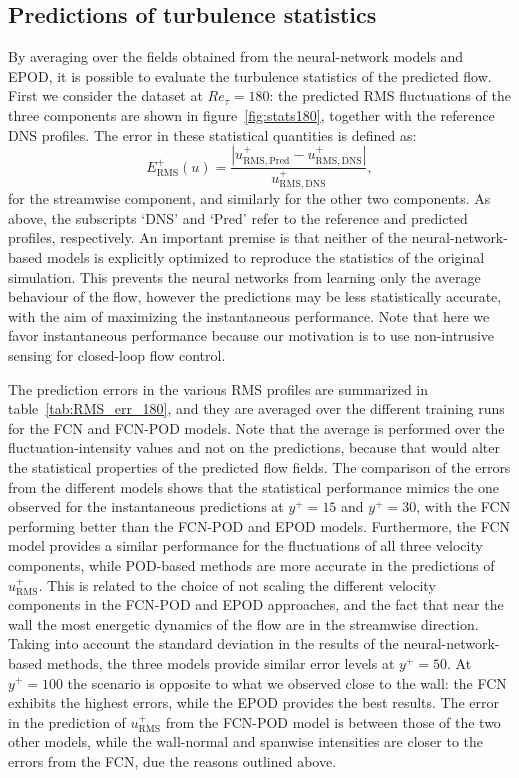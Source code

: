 \subsection{Predictions of turbulence statistics}\label{ss:stat}

By averaging over the fields obtained from the neural-network models and EPOD, it is possible to evaluate the turbulence statistics of the predicted flow.
First we consider the dataset at $Re_{\tau}=180$: the predicted RMS fluctuations of the three components are shown in figure~\ref{fig:stats180}, together with the reference DNS profiles.
The error in these statistical quantities is defined as:
%
\begin{equation}
    E_\mathrm{RMS}^+(u) = \frac{\left| u_\mathrm{RMS,Pred}^+ - u_\mathrm{RMS,DNS}^+ \right|}{u_\mathrm{RMS,DNS}^+},
\end{equation}
for the streamwise component, and similarly for the other two components.
As above, the subscripts `DNS' and `Pred' refer to the reference and predicted profiles, respectively.
An important premise is that neither of the neural-network-based models is explicitly optimized to reproduce the statistics of the original simulation.
This prevents the neural networks from learning only the average behaviour of the flow, however the predictions may be less statistically accurate, with the aim of maximizing the instantaneous performance.
Note that here we favor instantaneous performance because our motivation is to use non-intrusive sensing for closed-loop flow control.

The prediction errors in the various RMS profiles are summarized in table~\ref{tab:RMS_err_180}, and they are averaged over the different training runs for the FCN and FCN-POD models.
Note that the average is performed over the fluctuation-intensity values and not on the predictions, because that would alter the statistical properties of the predicted flow fields.
The comparison of the errors from the different models shows that the statistical performance mimics the one observed for the instantaneous predictions at $y^+=15$ and $y^+=30$, with the FCN performing better than the FCN-POD and EPOD models.
Furthermore, the FCN model provides a similar performance for the fluctuations of all three velocity components, while POD-based methods are more accurate in the predictions of $u_\mathrm{RMS}^+$.
This is related to the choice of not scaling the different velocity components in the FCN-POD and EPOD approaches, and the fact that near the wall the most energetic dynamics of the flow are in the streamwise direction.
Taking into account the standard deviation in the results of the neural-network-based methods, the three models provide similar error levels at $y^+=50$. At $y^+=100$ the scenario is opposite to what we observed close to the wall: the FCN exhibits the highest errors, while the EPOD provides the best results.
The error in the prediction of $u_\mathrm{RMS}^+$ from the FCN-POD model is between those of the two other models, while the wall-normal and spanwise intensities are closer to the errors from the FCN, due the reasons outlined above.

